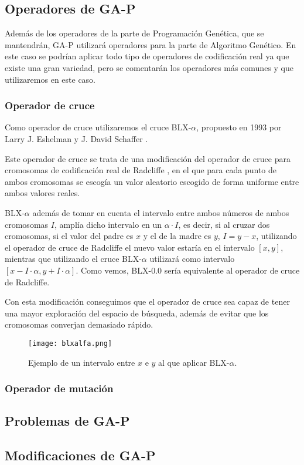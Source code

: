 \subsection{Operadores de GA-P}

Además de los operadores de la parte de Programación Genética, que se mantendrán, GA-P utilizará operadores para la parte de Algoritmo Genético. En este caso se podrían aplicar todo tipo de operadores de codificación real ya que existe una gran variedad, pero se comentarán los operadores más comunes y que utilizaremos en este caso.

\subsubsection{Operador de cruce}

Como operador de cruce utilizaremos el cruce BLX-$\alpha$, propuesto en 1993 por Larry J. Eshelman y J. David Schaffer \cite{cruceBLXalfa}.

Este operador de cruce se trata de una modificación del operador de cruce para cromosomas de codificación real de Radcliffe \cite{cruceRadcliffe}, en el que para cada punto de ambos cromosomas se escogía un valor aleatorio escogido de forma uniforme entre ambos valores reales.

BLX-$\alpha$ además de tomar en cuenta el intervalo entre ambos números de ambos cromosomas $I$, amplía dicho intervalo en un $\alpha \cdot I$, es decir, si al cruzar dos cromosomas, si el valor del padre es $x$ y el de la madre es $y$, $I = y - x$, utilizando el operador de cruce de Radcliffe el nuevo valor estaría en el intervalo $[x, y]$, mientras que utilizando el cruce BLX-$\alpha$ utilizará como intervalo $[x - I \cdot \alpha, y + I \cdot \alpha]$. Como vemos, BLX-$0.0$ sería equivalente al operador de cruce de Radcliffe.

Con esta modificación conseguimos que el operador de cruce sea capaz de tener una mayor exploración del espacio de búsqueda, además de evitar que los cromosomas converjan demasiado rápido.

\begin{figure}[H]
	 \centering
	 \texttt{[image: blxalfa.png]}
	 \caption{Ejemplo de un intervalo entre $x$ e $y$ al que aplicar BLX-$\alpha$.}
	\label{fig:cruceBLXa}
\end{figure}


\subsubsection{Operador de mutación}



\subsection{Problemas de GA-P}

\subsection{Modificaciones de GA-P}
